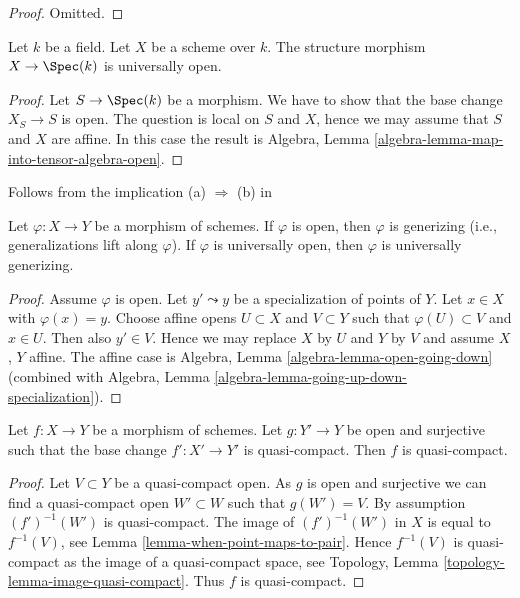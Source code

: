 \begin{proof}
Omitted.
\end{proof}

\begin{lemma}
\label{lemma-scheme-over-field-universally-open}
Let $k$ be a field. Let $X$ be a scheme over $k$.
The structure morphism $X \to \Spec(k)$ is universally open.
\end{lemma}

\begin{proof}
Let $S \to \Spec(k)$ be a morphism.
We have to show that the base change $X_S \to S$ is open.
The question is local on $S$ and $X$, hence we may assume that
$S$ and $X$ are affine. In this case the result is
Algebra, Lemma \ref{algebra-lemma-map-into-tensor-algebra-open}.
\end{proof}

\begin{lemma}
\label{lemma-open-generizing}
\begin{reference}
Follows from the implication (a) $\Rightarrow$ (b) in
\cite[IV, Corollary 1.10.4]{EGA}
\end{reference}
Let $\varphi : X \to Y$ be a morphism of schemes.
If $\varphi$ is open, then $\varphi$ is generizing
(i.e., generalizations lift along $\varphi$).
If $\varphi$ is universally open, then $\varphi$ is
universally generizing.
\end{lemma}

\begin{proof}
Assume $\varphi$ is open.
Let $y' \leadsto y$ be a specialization of points of $Y$.
Let $x \in X$ with $\varphi(x) = y$.
Choose affine opens $U \subset X$ and $V \subset Y$ such that
$\varphi(U) \subset V$ and $x \in U$. Then also $y' \in V$. Hence we
may replace $X$ by $U$ and $Y$ by $V$ and assume $X$, $Y$ affine.
The affine case is
Algebra, Lemma \ref{algebra-lemma-open-going-down}
(combined with
Algebra, Lemma \ref{algebra-lemma-going-up-down-specialization}).
\end{proof}

\begin{lemma}
\label{lemma-descent-quasi-compact}
Let $f : X \to Y$ be a morphism of schemes.
Let $g : Y' \to Y$ be open and surjective such that the base change
$f' : X' \to Y'$ is quasi-compact. Then $f$ is quasi-compact.
\end{lemma}

\begin{proof}
Let $V \subset Y$ be a quasi-compact open. As $g$ is open and surjective
we can find a quasi-compact open $W' \subset W$ such that $g(W') = V$.
By assumption $(f')^{-1}(W')$ is quasi-compact. The image of
$(f')^{-1}(W')$ in $X$ is equal to $f^{-1}(V)$, see
Lemma \ref{lemma-when-point-maps-to-pair}.
Hence $f^{-1}(V)$ is quasi-compact as the image of a quasi-compact space, see
Topology, Lemma \ref{topology-lemma-image-quasi-compact}.
Thus $f$ is quasi-compact.
\end{proof}





